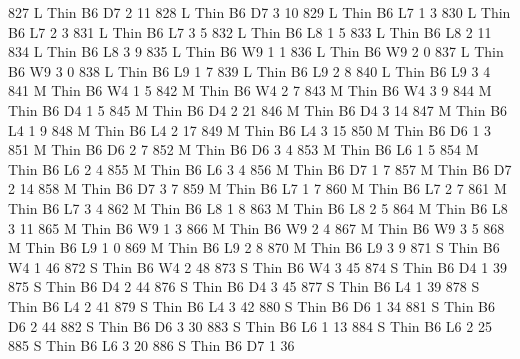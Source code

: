 \documentclass{article}
\begin{document}
\begin{Schunk}
\begin{Soutput}
827       L   Thin   B6      D7     2    11
828       L   Thin   B6      D7     3    10
829       L   Thin   B6      L7     1     3
830       L   Thin   B6      L7     2     3
831       L   Thin   B6      L7     3     5
832       L   Thin   B6      L8     1     5
833       L   Thin   B6      L8     2    11
834       L   Thin   B6      L8     3     9
835       L   Thin   B6      W9     1     1
836       L   Thin   B6      W9     2     0
837       L   Thin   B6      W9     3     0
838       L   Thin   B6      L9     1     7
839       L   Thin   B6      L9     2     8
840       L   Thin   B6      L9     3     4
841       M   Thin   B6      W4     1     5
842       M   Thin   B6      W4     2     7
843       M   Thin   B6      W4     3     9
844       M   Thin   B6      D4     1     5
845       M   Thin   B6      D4     2    21
846       M   Thin   B6      D4     3    14
847       M   Thin   B6      L4     1     9
848       M   Thin   B6      L4     2    17
849       M   Thin   B6      L4     3    15
850       M   Thin   B6      D6     1     3
851       M   Thin   B6      D6     2     7
852       M   Thin   B6      D6     3     4
853       M   Thin   B6      L6     1     5
854       M   Thin   B6      L6     2     4
855       M   Thin   B6      L6     3     4
856       M   Thin   B6      D7     1     7
857       M   Thin   B6      D7     2    14
858       M   Thin   B6      D7     3     7
859       M   Thin   B6      L7     1     7
860       M   Thin   B6      L7     2     7
861       M   Thin   B6      L7     3     4
862       M   Thin   B6      L8     1     8
863       M   Thin   B6      L8     2     5
864       M   Thin   B6      L8     3    11
865       M   Thin   B6      W9     1     3
866       M   Thin   B6      W9     2     4
867       M   Thin   B6      W9     3     5
868       M   Thin   B6      L9     1     0
869       M   Thin   B6      L9     2     8
870       M   Thin   B6      L9     3     9
871       S   Thin   B6      W4     1    46
872       S   Thin   B6      W4     2    48
873       S   Thin   B6      W4     3    45
874       S   Thin   B6      D4     1    39
875       S   Thin   B6      D4     2    44
876       S   Thin   B6      D4     3    45
877       S   Thin   B6      L4     1    39
878       S   Thin   B6      L4     2    41
879       S   Thin   B6      L4     3    42
880       S   Thin   B6      D6     1    34
881       S   Thin   B6      D6     2    44
882       S   Thin   B6      D6     3    30
883       S   Thin   B6      L6     1    13
884       S   Thin   B6      L6     2    25
885       S   Thin   B6      L6     3    20
886       S   Thin   B6      D7     1    36

\end{Soutput}
\end{Schunk}
\end{document}
